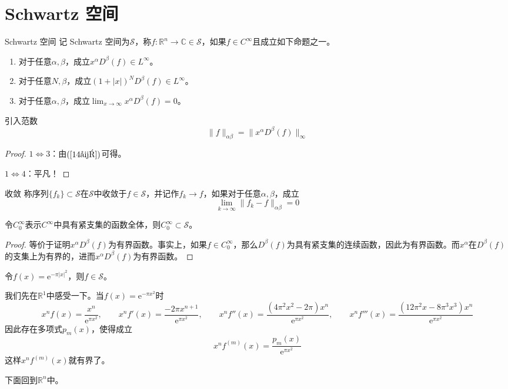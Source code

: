\documentclass[lang = cn, %
scheme = chinese          %
]
{elegantbook}             %
\newcommand{\R}{\mathbb{R}}            %
\newcommand{\C}{\mathbb{C}}  		   %
\newcommand{\sub}{\subset}             %
\newcommand{\ee}[1]{\mathrm{e}^{#1}}           %
\newcommand{\dis}{\displaystyle}
\begin{document}
\chapter{Schwartz 空间}

\begin{definition}{Schwartz 空间}
	记 Schwartz 空间为$\mathcal{S}$，称$f:\R^n\to\C\in\mathcal{S}$，如果$f\in C^\infty$且成立如下命题之一。
	\begin{enumerate}
		\item 对于任意$\alpha,\beta$，成立$x^\alpha D^\beta(f)\in L^\infty$。
		\item 对于任意$N,\beta$，成立$(1+|x|)^N D^\beta(f)\in L^\infty$。
		\item 对于任意$\alpha,\beta$，成立$\dis\lim_{x\to\infty}x^\alpha D^\beta(f)=0$。
	\end{enumerate}
	引入范数
	\[
	\|f\|_{\alpha\beta}=\|x^\alpha D^\beta(f)\|_{\infty}
	\]
\end{definition}

\begin{proof}
	$1\iff 3$：由$(\ref{14式})$可得。

	$1\iff 4$：平凡！
\end{proof}

\begin{definition}{收敛}
	称序列$\{ f_k \}\sub\mathcal{S}$在$\mathcal{S}$中收敛于$f\in\mathcal{S}$，并记作$f_k\to f$，如果对于任意$\alpha,\beta$，成立
	\[
	\lim_{k\to\infty}\|f_k-f\|_{\alpha\beta}=0
	\]
\end{definition}

\begin{example}
	令$C_0^\infty$表示$C^\infty$中具有紧支集的函数全体，则$C_0^\infty\sub\mathcal{S}$。
\end{example}

\begin{proof}
	等价于证明$x^\alpha D^\beta(f)$为有界函数。事实上，如果$f\in C_0^\infty$，那么$D^\beta(f)$为具有紧支集的连续函数，因此为有界函数。而$x^\alpha$在$D^\beta(f)$的支集上为有界的，进而$x^\alpha D^\beta(f)$为有界函数。
\end{proof}

\begin{example}
	令$f(x)=\ee{-\pi |x|^2}$，则$f\in \mathcal{S}$。
\end{example}

\begin{note}
	我们先在$\R^1$中感受一下。当$f(x)=\ee{-\pi x^2}$时
	\[
	x^nf(x)=\frac{x^n}{\ee{\pi x^2}},\qquad
	x^nf'(x)=\frac{-2 \pi x^{n+1}}{\ee{\pi x^2}},\qquad
	x^nf''(x)=\frac{(4 \pi ^2 x^2-2 \pi) x^n}{\ee{\pi x^2}},\qquad
	x^nf'''(x)=\frac{(12 \pi^2x-8 \pi^3 x^3) x^n}{\ee{\pi x^2}}
	\]
	因此存在多项式$p_m(x)$，使得成立
	\[
	x^nf^{(m)}(x)=\frac{p_m(x)}{\ee{\pi x^2}}
	\]
	这样$x^nf^{(m)}(x)$就有界了。
	
	下面回到$\R^n$中。
\end{note}
\end{document}
